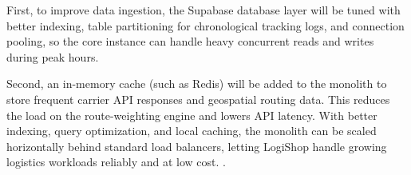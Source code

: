 First, to improve data ingestion, the Supabase database layer will be tuned with better indexing, table partitioning for chronological tracking logs, and connection pooling, so the core instance can handle heavy concurrent reads and writes during peak hours.

Second, an in-memory cache (such as Redis) will be added to the monolith to store frequent carrier API responses and geospatial routing data. This reduces the load on the route-weighting engine and lowers API latency. With better indexing, query optimization, and local caching, the monolith can be scaled horizontally behind standard load balancers, letting LogiShop handle growing logistics workloads reliably and at low cost. \cite{harpreet2023overcoming} \cite{khedr2024enhancing}.